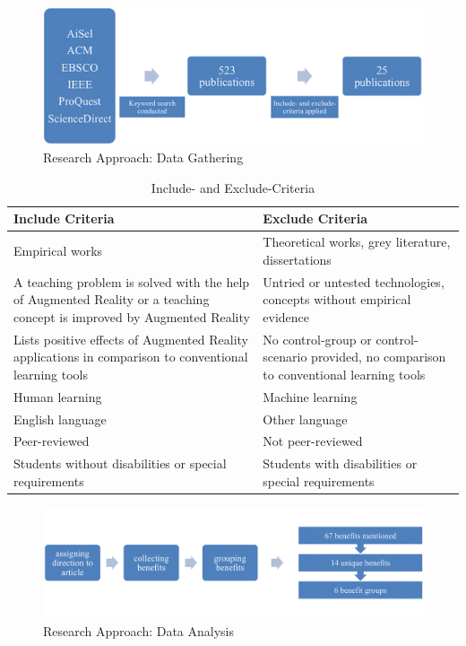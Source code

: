 \begin{figure}[ptbh]
    \centering
    \includegraphics[width=\linewidth]{figures/research_approach_part_1.png}
    \caption[Research Approach: Data Gathering]{Research Approach: Data Gathering}
    \label{fig:ResearchApproachGathering}
\end{figure}

\begin{table}[ptbh]
    \center
    \begin{tabular}{p{16.75em} | p{16.75em}}
        \textbf{Include Criteria} & \textbf{Exclude Criteria} \\
        \hline
        Empirical works & Theoretical works, grey literature, dissertations \\
        A teaching problem is solved with the help of Augmented Reality or a teaching concept is improved by Augmented Reality & Untried or untested technologies, concepts without empirical evidence \\
        Lists positive effects of Augmented Reality applications in comparison to conventional learning tools & No control-group or control-scenario provided, no comparison to conventional learning tools \\
        Human learning & Machine learning \\
        English language & Other language \\
        Peer-reviewed & Not peer-reviewed \\
        Students without disabilities or special requirements & Students with disabilities or special requirements \\
    \end{tabular}
    \caption[Include- and Exclude-Criteria]{Include- and Exclude-Criteria}
    \label{tab:IncludeExcludeCriteria}
\end{table}

\begin{figure}[ptbh]
    \centering
    \includegraphics[width=\linewidth]{figures/research_approach_part_2.png}
    \caption[Research Approach: Data Analysis]{Research Approach: Data Analysis}
    \label{fig:ResearchApproachAnalysis}
\end{figure}

